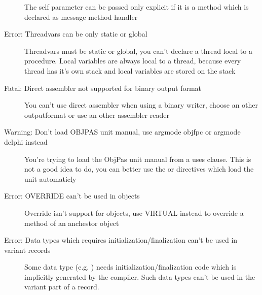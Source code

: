 \begin{description}
 The self parameter can be passed only explicit if it is a method which
 is declared as message method handler
\item [Error: Threadvars can be only static or global]
 Threadvars must be static or global, you can't declare a thread
 local to a procedure. Local variables are always local to a thread,
 because every thread has it's own stack and local variables
 are stored on the stack
\item [Fatal: Direct assembler not supported for binary output format]
 You can't use direct assembler when using a binary writer, choose an
 other outputformat or use an other assembler reader
\item [Warning: Don't load OBJPAS unit manual, use {argmode objfpc} or {argmode delphi} instead]
 You're trying to load the ObjPas unit manual from a uses clause. This is
 not a good idea to do, you can better use the  or
 directives which load the unit automaticly
\item [Error: OVERRIDE can't be used in objects]
 Override isn't support for objects, use VIRTUAL instead to override
 a method of an anchestor object
\item [Error: Data types which requires initialization/finalization can't be used in variant records]
 Some data type (e.g. ) needs initialization/finalization
 code which is implicitly generated by the compiler. Such data types
 can't be used in the variant part of a record.
 \end{description}

